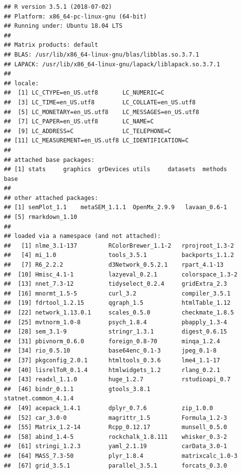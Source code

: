 \documentclass[]{article}
\begin{document}
\begin{verbatim}
## R version 3.5.1 (2018-07-02)
## Platform: x86_64-pc-linux-gnu (64-bit)
## Running under: Ubuntu 18.04 LTS
## 
## Matrix products: default
## BLAS: /usr/lib/x86_64-linux-gnu/blas/libblas.so.3.7.1
## LAPACK: /usr/lib/x86_64-linux-gnu/lapack/liblapack.so.3.7.1
## 
## locale:
##  [1] LC_CTYPE=en_US.utf8       LC_NUMERIC=C             
##  [3] LC_TIME=en_US.utf8        LC_COLLATE=en_US.utf8    
##  [5] LC_MONETARY=en_US.utf8    LC_MESSAGES=en_US.utf8   
##  [7] LC_PAPER=en_US.utf8       LC_NAME=C                
##  [9] LC_ADDRESS=C              LC_TELEPHONE=C           
## [11] LC_MEASUREMENT=en_US.utf8 LC_IDENTIFICATION=C      
## 
## attached base packages:
## [1] stats     graphics  grDevices utils     datasets  methods   base     
## 
## other attached packages:
## [1] semPlot_1.1    metaSEM_1.1.1  OpenMx_2.9.9   lavaan_0.6-1  
## [5] rmarkdown_1.10
## 
## loaded via a namespace (and not attached):
##   [1] nlme_3.1-137         RColorBrewer_1.1-2   rprojroot_1.3-2     
##   [4] mi_1.0               tools_3.5.1          backports_1.1.2     
##   [7] R6_2.2.2             d3Network_0.5.2.1    rpart_4.1-13        
##  [10] Hmisc_4.1-1          lazyeval_0.2.1       colorspace_1.3-2    
##  [13] nnet_7.3-12          tidyselect_0.2.4     gridExtra_2.3       
##  [16] mnormt_1.5-5         curl_3.2             compiler_3.5.1      
##  [19] fdrtool_1.2.15       qgraph_1.5           htmlTable_1.12      
##  [22] network_1.13.0.1     scales_0.5.0         checkmate_1.8.5     
##  [25] mvtnorm_1.0-8        psych_1.8.4          pbapply_1.3-4       
##  [28] sem_3.1-9            stringr_1.3.1        digest_0.6.15       
##  [31] pbivnorm_0.6.0       foreign_0.8-70       minqa_1.2.4         
##  [34] rio_0.5.10           base64enc_0.1-3      jpeg_0.1-8          
##  [37] pkgconfig_2.0.1      htmltools_0.3.6      lme4_1.1-17         
##  [40] lisrelToR_0.1.4      htmlwidgets_1.2      rlang_0.2.1         
##  [43] readxl_1.1.0         huge_1.2.7           rstudioapi_0.7      
##  [46] bindr_0.1.1          gtools_3.8.1         statnet.common_4.1.4
##  [49] acepack_1.4.1        dplyr_0.7.6          zip_1.0.0           
##  [52] car_3.0-0            magrittr_1.5         Formula_1.2-3       
##  [55] Matrix_1.2-14        Rcpp_0.12.17         munsell_0.5.0       
##  [58] abind_1.4-5          rockchalk_1.8.111    whisker_0.3-2       
##  [61] stringi_1.2.3        yaml_2.1.19          carData_3.0-1       
##  [64] MASS_7.3-50          plyr_1.8.4           matrixcalc_1.0-3    
##  [67] grid_3.5.1           parallel_3.5.1       forcats_0.3.0       

\end{verbatim}
\end{document}
